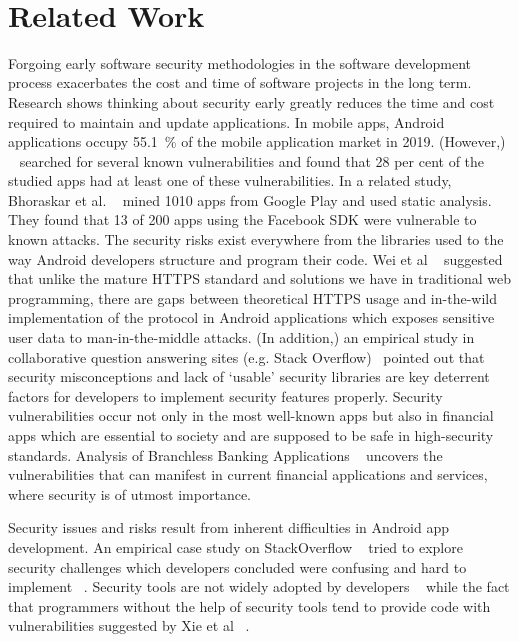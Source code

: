 
~\section{Related Work}

Forgoing early software security methodologies in the software development process exacerbates the cost and time of software projects in the long term.  Research shows thinking about security early greatly reduces the time and cost required to maintain and update applications. In mobile apps, Android applications occupy 55.1~\% of the mobile application market in 2019. (However,) ~\cite{martin2016survey} searched for several known vulnerabilities and found that 28 per cent of the studied apps had at least one of these vulnerabilities. In a related study, Bhoraskar et al. ~\cite{bhoraskar2014brahmastra} mined 1010 apps from Google Play and used static analysis. They found that 13 of 200 apps using the Facebook SDK were vulnerable to known attacks.  The security risks exist everywhere from the libraries used to the way Android developers structure and program their code. Wei et al ~\cite{wei2017survey} suggested that unlike the mature HTTPS standard and solutions we have in traditional web programming, there are gaps between theoretical HTTPS usage and in-the-wild implementation of the protocol in Android applications which exposes sensitive user data to man-in-the-middle attacks. (In addition,) an empirical study in collaborative question answering sites (e.g. Stack Overflow)~\cite{rahman2016empirical} pointed out that security misconceptions and lack of ‘usable’ security libraries are key deterrent factors for developers to implement security features properly. Security vulnerabilities occur not only in the most well-known apps but also in financial apps which are essential to society and are supposed to be safe in high-security standards. Analysis of Branchless Banking Applications ~\cite{reaves2017mo} uncovers the vulnerabilities that can manifest in current financial applications and services, where security is of utmost importance.

Security issues and risks result from inherent difficulties in Android app development. An empirical case study on StackOverflow ~\cite{rahman2016empirical} tried to explore security challenges which developers concluded were confusing and hard to implement ~\cite{naiakshina2017developers}. Security tools are not widely adopted by developers ~\cite{witschey2015quantifying} while the fact that programmers without the help of security tools tend to provide code with vulnerabilities suggested by Xie et al ~\cite{xie2011programmers}. 


